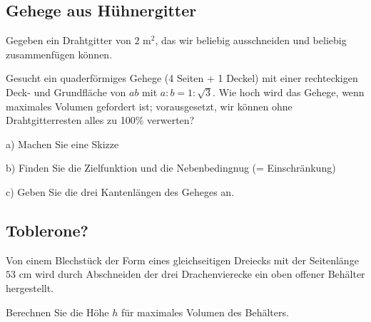 \subsection{Gehege aus Hühnergitter}

 Gegeben ein Drahtgitter von $2 \text{ m}^2$, das wir beliebig ausschneiden
    und beliebig zusammenfügen können.
    
    Gesucht ein quaderförmiges Gehege (4 Seiten + 1 Deckel) mit einer 
    rechteckigen Deck- und Grundfläche von $ab$ mit $a:b = 1:\sqrt{3}$.
    Wie
    hoch wird das Gehege, wenn maximales Volumen gefordert ist;
    vorausgesetzt, wir können ohne Drahtgitterresten alles zu 100\%
    verwerten?

a) Machen Sie eine Skizze

b) Finden Sie die Zielfunktion und die Nebenbedingnug (=
Einschränkung)

c) Geben Sie die drei Kantenlängen des Geheges an.



\subsection{Toblerone?}

Von einem Blechstück der Form eines gleichseitigen Dreiecks mit der
Seitenlänge $53 \text{ cm}$
wird durch Abschneiden der drei Drachenvierecke ein oben offener Behälter hergestellt.

Berechnen Sie die Höhe $h$ für maximales Volumen des Behälters.





